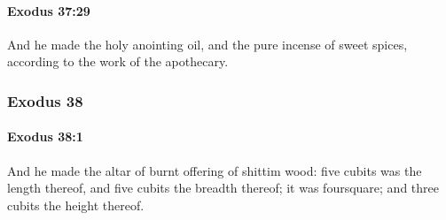 		\paragraph{Exodus 37:29} %
			\label{EXODUS-37-29}

			And he made the holy anointing oil, and the pure incense of sweet spices, according to the work of the apothecary.

	\subsubsection{Exodus 38} %
		\label{EXODUS-38}

		\paragraph{Exodus 38:1} %
			\label{EXODUS-38-1}

			And he made the altar of burnt offering of shittim wood: five cubits was the length thereof, and five cubits the breadth thereof; it was foursquare; and three cubits the height thereof.


